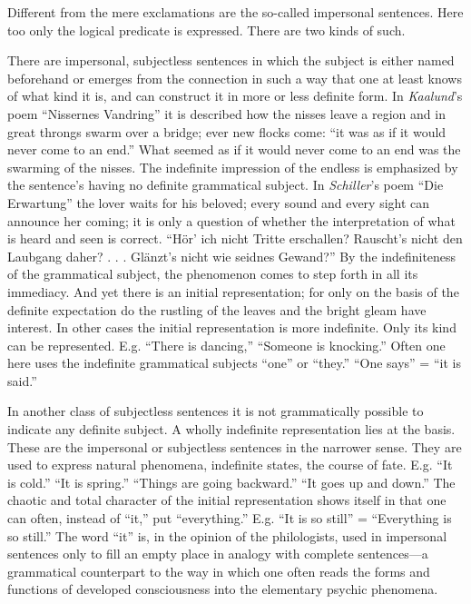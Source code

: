 \documentclass[12pt,a4paper]{book}
\newcommand{\opage}[1]{\marginnote{\footnotesize\textit{[#1]}}}
\begin{document}
Different from the mere exclamations are the so-called impersonal
sentences. Here too only the logical predicate is expressed. There are two
kinds of such.

There are impersonal, subjectless sentences in which the subject is either
named beforehand or emerges from the connection in such a way that one at
least knows of what kind it is, and can construct it in more or less
definite form. In \emph{Kaalund}'s poem ``Nissernes Vandring'' it is
described how the nisses leave a region and in great throngs swarm over a
bridge; ever new flocks come: ``it was as if it would never \opage{86}come to an
end.'' What seemed as if it would never come to an end was the swarming of
the nisses. The indefinite impression of the endless is emphasized by the
sentence's having no definite grammatical subject. In \emph{Schiller}'s
poem ``Die Erwartung'' the lover waits for his beloved; every sound and
every sight can announce her coming; it is only a question of whether the
interpretation of what is heard and seen is correct. ``Hör' ich nicht
Tritte erschallen? Rauscht's nicht den Laubgang daher? . . . Glänzt's
nicht wie seidnes Gewand?'' By the indefiniteness of the grammatical
subject, the phenomenon comes to step forth in all its immediacy. And yet
there is an initial representation; for only on the basis of the definite
expectation do the rustling of the leaves and the bright gleam have
interest. In other cases the initial representation is more indefinite.
Only its kind can be represented. E.g. ``There is dancing,'' ``Someone is
knocking.'' Often one here uses the indefinite grammatical subjects ``one''
or ``they.'' ``One says'' = ``it is said.''

In another class of subjectless sentences it is not grammatically possible
to indicate any definite subject. A wholly indefinite representation lies
at the basis. These are the impersonal or subjectless sentences in the
narrower sense. They are used to express natural phenomena, indefinite
states, the course of fate. E.g. ``It is cold.'' ``It is spring.''
``Things are going backward.'' ``It goes up and down.'' The chaotic and
total character of the initial representation shows itself in that one can
often, instead of ``it,'' put ``everything.'' E.g. ``It is so still'' =
``Everything is so still.'' The word ``it'' is, in the opinion of the
philologists, used in impersonal sentences only to fill an empty place in
analogy with complete sentences---a grammatical counterpart to the way in
which one often reads the forms and functions of developed consciousness
into the elementary psychic phenomena.
\end{document}
